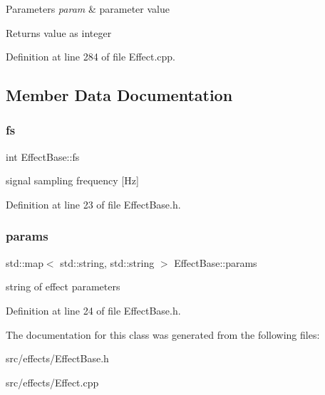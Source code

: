 \begin{DoxyParams}{Parameters}
{\em param} & parameter value \\
\hline
\end{DoxyParams}
\begin{DoxyReturn}{Returns}
value as integer 
\end{DoxyReturn}


Definition at line 284 of file Effect.\+cpp.



\subsection{Member Data Documentation}
\mbox{\label{class_effect_base_a18021994da076630edfe26d69fd1384f}} 
\subsubsection{\texorpdfstring{fs}{fs}}
{\footnotesize\ttfamily int Effect\+Base\+::fs\hspace{0.3cm}{\ttfamily [static]}}

signal sampling frequency \mbox{[}Hz\mbox{]} 

Definition at line 23 of file Effect\+Base.\+h.

\mbox{\label{class_effect_base_a593c207eb855ae1bc37069766da29c9a}} 
\subsubsection{\texorpdfstring{params}{params}}
{\footnotesize\ttfamily std\+::map$<$ std\+::string, std\+::string $>$ Effect\+Base\+::params\hspace{0.3cm}{\ttfamily [static]}}

string of effect parameters 

Definition at line 24 of file Effect\+Base.\+h.



The documentation for this class was generated from the following files\+:\begin{DoxyCompactItemize}
\item 
src/effects/Effect\+Base.\+h\item 
src/effects/Effect.\+cpp\end{DoxyCompactItemize}
